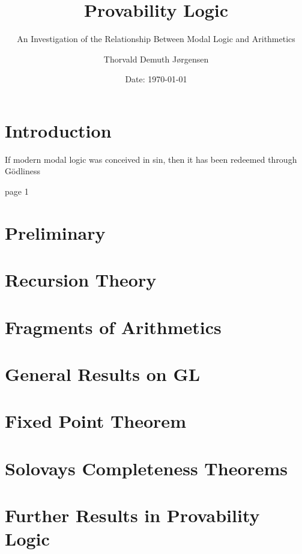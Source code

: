 \documentclass[12pt,a4paper,dvipsnames,bibliography=totocnumbered]{scrbook}
\author{Thorvald Demuth Jørgensen}
\title{Provability Logic}
\subtitle{An Investigation of the Relationship Between Modal Logic and
Arithmetics}
\date{Date: {\today}}
\theoremstyle{dotlessS}
\theoremstyle{dotlessS}
\theoremstyle{dotlessS}
\theoremstyle{dotlessS}
\theoremstyle{dotlessS}
\theoremstyle{dotlessS}
\theoremstyle{dotlessS}
\newcommand{\0}{\overline{0}}
\newcommand{\1}{\raisebox{\dimexpr1.79ex- \height}{$1$}}
\begin{document}
\maketitle
\tableofcontents
\newpage


\chapter{Introduction}
\epigraph{If modern modal logic was conceived in sin, then it has been redeemed
through Gödliness}{\cite{Boolos1979} page 1}
\label{chap:intro}


\chapter{Preliminary}
\label{chap:Pre}


\chapter{Recursion Theory}
\label{chap:Recur}


\chapter{Fragments of Arithmetics}
\label{chap:PRA}


\chapter{General Results on GL}
\label{chap:GL}


\chapter{Fixed Point Theorem}
\label{chap:Fixed}


\chapter{Solovays Completeness Theorems}
\label{chap:Complete}


\chapter{Further Results in Provability Logic}
\label{chap:Further}


\nocite{*}
\printbibliography

\appendix

\end{document}
